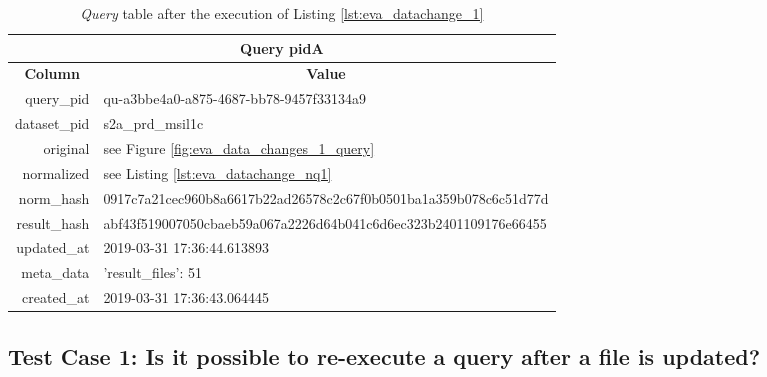 \documentclass[draft,final]{vutinfth} %
\begin{document}
\begin{enumerate}
	\begin{table}[]
		\caption{\textit{Query} table after the execution of Listing \ref{lst:eva_datachange_1}}
		\centering
		\begin{tabular}{|r|l|}
			\hline \multicolumn{2}{|c|}{\textbf{Query pidA}} \\
			\hline \multicolumn{1}{|c|}{\textbf{Column}}  &  \multicolumn{1}{c|}{\textbf{Value}} \\ \hline
			query\_pid & qu-a3bbe4a0-a875-4687-bb78-9457f33134a9  \\ 
			dataset\_pid & s2a\_prd\_msil1c  \\ 
			original & see Figure \ref{fig:eva_data_changes_1_query}   \\
			normalized & see Listing \ref{lst:eva_datachange_nq1}  \\
			norm\_hash & 0917c7a21cec960b8a6617b22ad26578c2c67f0b0501ba1a359b078c6c51d77d  \\
			result\_hash & abf43f519007050cbaeb59a067a2226d64b041c6d6ec323b2401109176e66455   \\
			updated\_at & 2019-03-31 17:36:44.613893   \\
			meta\_data & {'result\_files': 51}  \\
			created\_at & 2019-03-31 17:36:43.064445   \\ \hline
		\end{tabular}
		\label{Tab:eva_datachanges1}
	\end{table}
\end{enumerate}

\subsection{Test Case 1: Is it possible to re-execute a query after a file is updated?}	\label{Tab:eva_datachanges_tc1}
\end{document}
